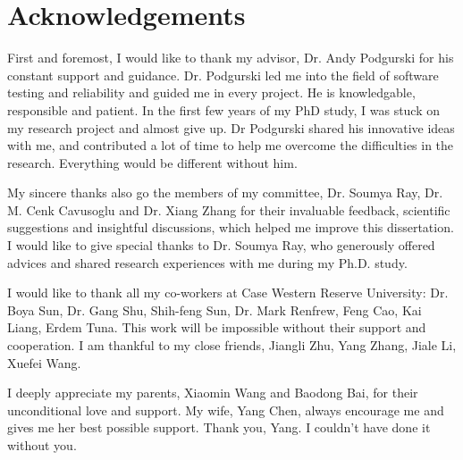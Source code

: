 
\newpage
\section*{Acknowledgements}
First and foremost, I would like to thank my advisor, Dr. Andy Podgurski for his constant support and guidance.  Dr. Podgurski led me into the field of software testing and reliability and guided me in every project. He is  knowledgable, responsible and patient.  In the first few years of my PhD study, I was stuck on my research project and almost give up. Dr Podgurski shared his innovative ideas with me, and contributed a lot of time to help me overcome the difficulties in the research. Everything would be different without him. 

My sincere thanks also go the members of my committee, Dr. Soumya Ray,  Dr. M. Cenk Cavusoglu and Dr. Xiang Zhang for their invaluable feedback, scientific suggestions and insightful discussions, which helped me improve this dissertation. I would like to give special thanks to Dr. Soumya Ray, who generously offered advices and shared research experiences with me during my Ph.D. study.

I would like to thank all my co-workers at Case Western Reserve University: Dr. Boya Sun, Dr. Gang Shu, Shih-feng Sun, Dr. Mark Renfrew, Feng Cao, Kai Liang,  Erdem Tuna. This work will be impossible without their support and cooperation. I am thankful to my close friends, Jiangli Zhu, Yang Zhang, Jiale Li, Xuefei Wang. 

I deeply appreciate my parents, Xiaomin Wang and Baodong Bai, for their unconditional love and support. My wife, Yang Chen, always encourage me and gives me her best possible support. Thank you, Yang. I couldn’t have done it without you. 

